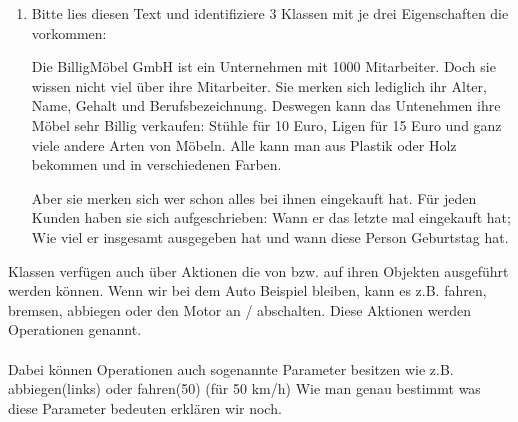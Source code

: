 \begin{enumerate}[label=\alph*)]
    \item Bitte lies diesen Text und identifiziere 3 Klassen mit je drei Eigenschaften die vorkommen:

    Die BilligMöbel GmbH ist ein Unternehmen mit 1000 Mitarbeiter. Doch sie wissen nicht viel über ihre Mitarbeiter. Sie merken sich lediglich ihr Alter, Name, Gehalt und Berufsbezeichnung. Deswegen kann das Untenehmen ihre Möbel sehr Billig verkaufen: Stühle für 10 Euro, Ligen für 15 Euro und ganz viele andere Arten von Möbeln. Alle kann man aus Plastik oder Holz bekommen und in verschiedenen Farben.

    Aber sie merken sich wer schon alles bei ihnen eingekauft hat. Für jeden Kunden haben sie sich aufgeschrieben: Wann er das letzte mal eingekauft hat; Wie viel er insgesamt ausgegeben hat und wann diese Person Geburtstag hat.
\end{enumerate}

\begin{Infobox}
    Klassen verfügen auch über Aktionen die von bzw. auf ihren Objekten ausgeführt werden können. Wenn wir bei dem Auto Beispiel bleiben, kann es z.B. fahren, bremsen, abbiegen oder den Motor an / abschalten. Diese Aktionen werden Operationen genannt.
    \paragraph{}
    Dabei können Operationen auch sogenannte Parameter besitzen wie z.B. abbiegen(links) oder fahren(50) (für 50 km/h) Wie man genau bestimmt was diese Parameter bedeuten erklären wir noch.
\end{Infobox}


